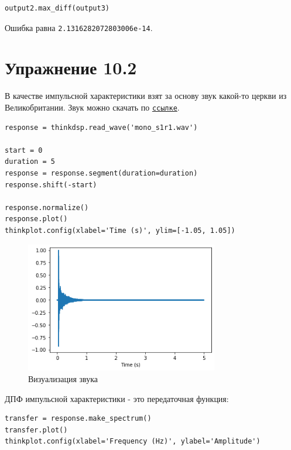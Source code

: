 \documentclass[a4paper,12pt]{report}
\begin{document}
\begin{lstlisting}[caption=Сравнение результатов]
output2.max_diff(output3)
\end{lstlisting}

Ошибка равна \texttt{2.1316282072803006e-14}.

\chapter{Упражнение 10.2}

В качестве импульсной характеристики взят за основу звук какой-то церкви из Великобритании. Звук можно скачать по \href{https://www.openair.hosted.york.ac.uk/?page_id=406}{\texttt{ссылке}}.

\begin{lstlisting}[caption=Загрузка звука]
response = thinkdsp.read_wave('mono_s1r1.wav')

start = 0
duration = 5
response = response.segment(duration=duration)
response.shift(-start)

response.normalize()
response.plot()
thinkplot.config(xlabel='Time (s)', ylim=[-1.05, 1.05])
\end{lstlisting}

\begin{figure}[H]
        \centering
        \includegraphics[width=0.75\textwidth]{lab10_fig2_1.png}
        \caption{Визуализация звука}
        \label{fig:lab10_fig2_1}
\end{figure}

ДПФ импульсной характеристики - это передаточная функция:

\begin{lstlisting}[caption=Спектр звука]
transfer = response.make_spectrum()
transfer.plot()
thinkplot.config(xlabel='Frequency (Hz)', ylabel='Amplitude')
\end{lstlisting}
\end{document}
